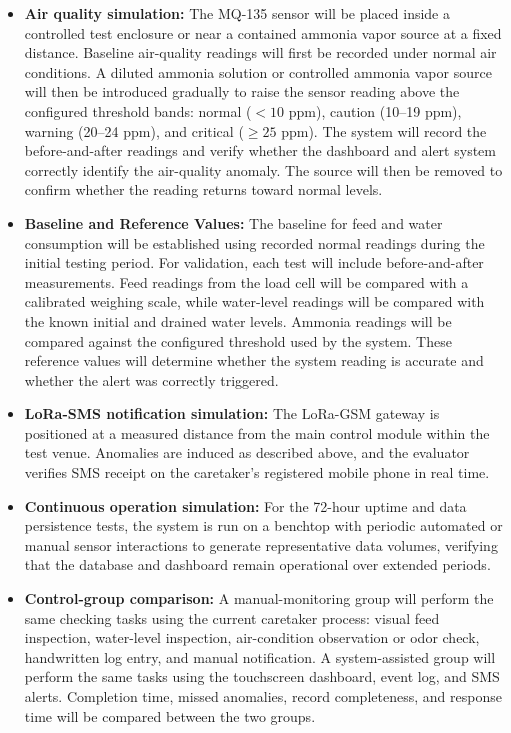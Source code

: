 \begin{itemize}
  \item \textbf{Air quality simulation:} The MQ-135 sensor will be placed inside a controlled test enclosure or near a contained ammonia vapor source at a fixed distance. Baseline air-quality readings will first be recorded under normal air conditions. A diluted ammonia solution or controlled ammonia vapor source will then be introduced gradually to raise the sensor reading above the configured threshold bands: normal ($<10$ ppm), caution (10--19 ppm), warning (20--24 ppm), and critical ($\geq25$ ppm). The system will record the before-and-after readings and verify whether the dashboard and alert system correctly identify the air-quality anomaly. The source will then be removed to confirm whether the reading returns toward normal levels.
  \item \textbf{Baseline and Reference Values:} The baseline for feed and water consumption will be established using recorded normal readings during the initial testing period. For validation, each test will include before-and-after measurements. Feed readings from the load cell will be compared with a calibrated weighing scale, while water-level readings will be compared with the known initial and drained water levels. Ammonia readings will be compared against the configured threshold used by the system. These reference values will determine whether the system reading is accurate and whether the alert was correctly triggered.
  \item \textbf{LoRa-SMS notification simulation:} The LoRa-GSM gateway is positioned at a measured distance from the main control module within the test venue. Anomalies are induced as described above, and the evaluator verifies SMS receipt on the caretaker's registered mobile phone in real time.
  \item \textbf{Continuous operation simulation:} For the 72-hour uptime and data persistence tests, the system is run on a benchtop with periodic automated or manual sensor interactions to generate representative data volumes, verifying that the database and dashboard remain operational over extended periods.
  \item \textbf{Control-group comparison:} A manual-monitoring group will perform the same checking tasks using the current caretaker process: visual feed inspection, water-level inspection, air-condition observation or odor check, handwritten log entry, and manual notification. A system-assisted group will perform the same tasks using the touchscreen dashboard, event log, and SMS alerts. Completion time, missed anomalies, record completeness, and response time will be compared between the two groups.

\end{itemize}
